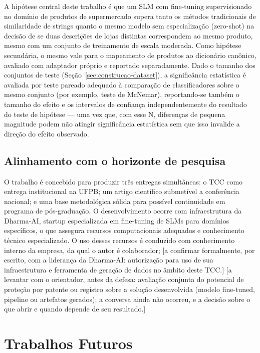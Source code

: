 \documentclass[
    article,
    12pt,
    oneside,
    a4paper,
    english,
    brazilian
    ]{abntex2}
\numberwithin{equation}{section}
\begin{document}
A hipótese central deste trabalho é que um SLM com fine-tuning supervisionado no domínio de produtos de supermercado supera tanto os métodos tradicionais de similaridade de strings quanto o mesmo modelo sem especialização (zero-shot) na decisão de se duas descrições de lojas distintas correspondem ao mesmo produto, mesmo com um conjunto de treinamento de escala moderada. Como hipótese secundária, o mesmo vale para o mapeamento de produtos ao dicionário canônico, avaliado com adaptador próprio e reportado separadamente. Dado o tamanho dos conjuntos de teste (Seção~\ref{sec:construcao-dataset}), a significância estatística é avaliada por teste pareado adequado à comparação de classificadores sobre o mesmo conjunto (por exemplo, teste de McNemar), reportando-se também o tamanho do efeito e os intervalos de confiança independentemente do resultado do teste de hipótese --- uma vez que, com esse N, diferenças de pequena magnitude podem não atingir significância estatística sem que isso invalide a direção do efeito observado.

\subsection{Alinhamento com o horizonte de pesquisa}

O trabalho é concebido para produzir três entregas simultâneas: o TCC como entrega institucional na UFPB; um artigo científico submetível a conferência nacional; e uma base metodológica sólida para possível continuidade em programa de pós-graduação. O desenvolvimento ocorre com infraestrutura da Dharma-AI, startup especializada em fine-tuning de SLMs para domínios específicos, o que assegura recursos computacionais adequados e conhecimento técnico especializado. O uso desses recursos é conduzido com conhecimento interno da empresa, da qual o autor é colaborador; [a confirmar formalmente, por escrito, com a liderança da Dharma-AI: autorização para uso de sua infraestrutura e ferramenta de geração de dados no âmbito deste TCC.] [a levantar com o orientador, antes da defesa: avaliação conjunta do potencial de proteção por patente ou registro sobre a solução desenvolvida (modelo fine-tuned, pipeline ou artefatos gerados); a conversa ainda não ocorreu, e a decisão sobre o que abrir e quando depende de seu resultado.]

\section{Trabalhos Futuros}
\end{document}
